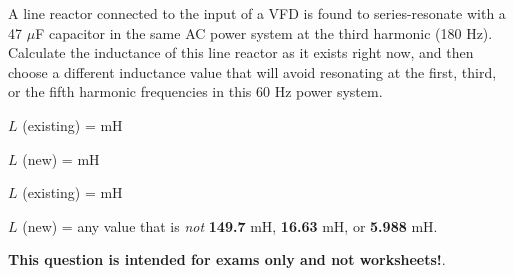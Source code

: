 

A line reactor connected to the input of a VFD is found to series-resonate with a 47 $\mu$F capacitor in the same AC power system at the third harmonic (180 Hz).  Calculate the inductance of this line reactor as it exists right now, and then choose a different inductance value that will avoid resonating at the first, third, or the fifth harmonic frequencies in this 60 Hz power system.

\vskip 30pt

$L$ (existing) = \underbar{\hskip 50pt} mH

\vskip 30pt

$L$ (new) = \underbar{\hskip 50pt} mH







$L$ (existing) =  mH

$L$ (new) = any value that is {\it not} {\bf 149.7} mH, {\bf 16.63} mH, or {\bf 5.988} mH.







{\bf This question is intended for exams only and not worksheets!}.


